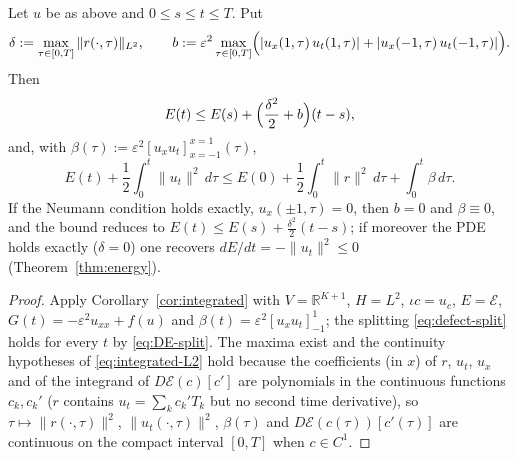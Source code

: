 \begin{Corollary}\label{cor:spinn-bound}
Let $u$ be as above and $0\le s\le t\le T$. Put
\[
\delta:=\max_{\tau\in[0,T]}\|r(\cdot,\tau)\|_{L^2},\qquad
b:=\varepsilon^2\max_{\tau\in[0,T]}\Bigl(|u_x(1,\tau)\,u_t(1,\tau)|+|u_x(-1,\tau)\,u_t(-1,\tau)|\Bigr).
\]
Then
\[
E(t)\le E(s)+\Bigl(\frac{\delta^2}{2}+b\Bigr)(t-s),
\]
and, with $\beta(\tau):=\varepsilon^2[u_xu_t]_{x=-1}^{x=1}(\tau)$,
\[
E(t)+\frac12\int_0^t\|u_t\|^2\,d\tau\le E(0)+\frac12\int_0^t\|r\|^2\,d\tau+\int_0^t\beta\,d\tau .
\]
If the Neumann condition holds exactly, $u_x(\pm1,\tau)=0$, then $b=0$ and $\beta\equiv0$, and the bound reduces to $E(t)\le E(s)+\frac{\delta^2}{2}(t-s)$; if moreover the PDE holds exactly ($\delta=0$) one recovers $dE/dt=-\|u_t\|^2\le0$ (Theorem~\ref{thm:energy}).
\end{Corollary}
\begin{proof}
Apply Corollary~\ref{cor:integrated} with $V=\mathbb{R}^{K+1}$, $H=L^2$, $\iota c=u_c$, $E=\mathcal{E}$, $G(t)=-\varepsilon^2u_{xx}+f(u)$ and $\beta(t)=\varepsilon^2[u_xu_t]_{-1}^{1}$; the splitting \eqref{eq:defect-split} holds for every $t$ by \eqref{eq:DE-split}.
The maxima exist and the continuity hypotheses of \eqref{eq:integrated-L2} hold because the coefficients (in $x$) of $r$, $u_t$, $u_x$ and of the integrand of $D\mathcal{E}(c)[c']$ are polynomials in the continuous functions $c_k,c_k'$ ($r$ contains $u_t=\sum_kc_k'T_k$ but no second time derivative), so $\tau\mapsto\|r(\cdot,\tau)\|^2$, $\|u_t(\cdot,\tau)\|^2$, $\beta(\tau)$ and $D\mathcal{E}(c(\tau))[c'(\tau)]$ are continuous on the compact interval $[0,T]$ when $c\in C^1$.
\end{proof}

